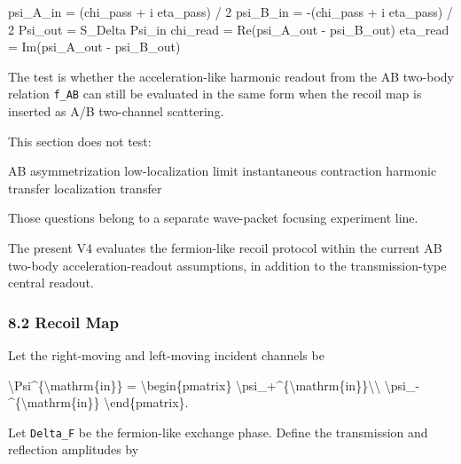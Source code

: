 \documentclass[
]{article}
\newenvironment{Shaded}{}{}
\newcommand{\NormalTok}[1]{#1}
\begin{document}
\begin{Shaded}
\begin{Highlighting}[]
\NormalTok{psi\_A\_in =  (chi\_pass + i eta\_pass) / 2}
\NormalTok{psi\_B\_in = {-}(chi\_pass + i eta\_pass) / 2}
\NormalTok{Psi\_out  = S\_Delta Psi\_in}
\NormalTok{chi\_read = Re(psi\_A\_out {-} psi\_B\_out)}
\NormalTok{eta\_read = Im(psi\_A\_out {-} psi\_B\_out)}
\end{Highlighting}
\end{Shaded}

The test is whether the acceleration-like harmonic readout from the AB
two-body relation \texttt{f\_AB} can still be evaluated in the same form
when the recoil map is inserted as A/B two-channel scattering.

This section does not test:

\begin{Shaded}
\begin{Highlighting}[]
\NormalTok{AB asymmetrization}
\NormalTok{low{-}localization limit}
\NormalTok{instantaneous contraction}
\NormalTok{harmonic transfer}
\NormalTok{localization transfer}
\end{Highlighting}
\end{Shaded}

Those questions belong to a separate wave-packet focusing experiment
line.

The present V4 evaluates the fermion-like recoil protocol within the
current AB two-body acceleration-readout assumptions, in addition to the
transmission-type central readout.

\subsubsection{8.2 Recoil Map}\label{recoil-map}

Let the right-moving and left-moving incident channels be

\begin{Shaded}
\begin{Highlighting}[]
\NormalTok{\textbackslash{}Psi\^{}\{\textbackslash{}mathrm\{in\}\}}
\NormalTok{=}
\NormalTok{\textbackslash{}begin\{pmatrix\}}
\NormalTok{\textbackslash{}psi\_+\^{}\{\textbackslash{}mathrm\{in\}\}\textbackslash{}\textbackslash{}}
\NormalTok{\textbackslash{}psi\_{-}\^{}\{\textbackslash{}mathrm\{in\}\}}
\NormalTok{\textbackslash{}end\{pmatrix\}.}
\end{Highlighting}
\end{Shaded}

Let \texttt{Delta\_F} be the fermion-like exchange phase. Define the
transmission and reflection amplitudes by
\end{document}
